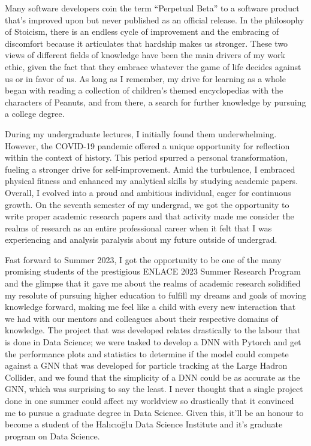 	\noindent
	Many software developers coin the term “Perpetual Beta” to a software product that's
	improved upon but never published as an official release. In the philosophy of Stoicism, there is an
	endless cycle of improvement and the embracing of discomfort because it articulates that hardship
	makes us stronger. These two views of different fields of knowledge have been the main drivers of my work
	ethic, given the fact that they embrace whatever the game of life decides against us or in favor of us.
	As long as I remember, my drive for learning as a whole began with reading a collection of
	children's themed encyclopedias with the characters of Peanuts, and from there, a search for further
	knowledge by pursuing a college degree.
	
	\setlength{\parindent}{.3in}
	During my undergraduate lectures, I initially found them underwhelming. However, the COVID-19 pandemic offered 
	a unique opportunity for reflection within the context of history. This period spurred a personal transformation, 
	fueling a stronger drive for self-improvement. Amid the turbulence, I embraced physical fitness and enhanced my analytical
	skills by studying academic papers. Overall, I evolved into a proud and ambitious individual, eager for continuous growth.
	On the seventh semester of my undergrad, we got the opportunity to write proper academic research papers and that activity made me consider the realms
	of research as an entire professional career when it felt that I was experiencing and analysis paralysis about my future outside of undergrad.

	Fast forward to Summer 2023, I got the opportunity to be one of the many promising students of the prestigious ENLACE 2023 Summer Research Program
	and the glimpse that it gave me about the realms of academic research solidified my resolute of pursuing higher education to fulfill my
	dreams and goals of moving knowledge forward, making me feel like a child with every new interaction that we had with our mentors and colleagues
	about their respective domains of knowledge. The project that was developed relates drastically to the labour that is done in Data Science;
	we were tasked to develop a DNN with Pytorch and get the performance plots and statistics to determine if the model could compete against a GNN
	that was developed for particle tracking at the Large Hadron Collider, and we found that the simplicity of a DNN could be as accurate as the GNN, which
	was surprising to say the least. I never thought that a single project done in one summer could affect my worldview so drastically that it convinced me to
	pursue a graduate degree in Data Science. Given this, it'll be an honour to become a student of the Halıcıoğlu Data Science Institute and 
	it's graduate program on Data Science.

